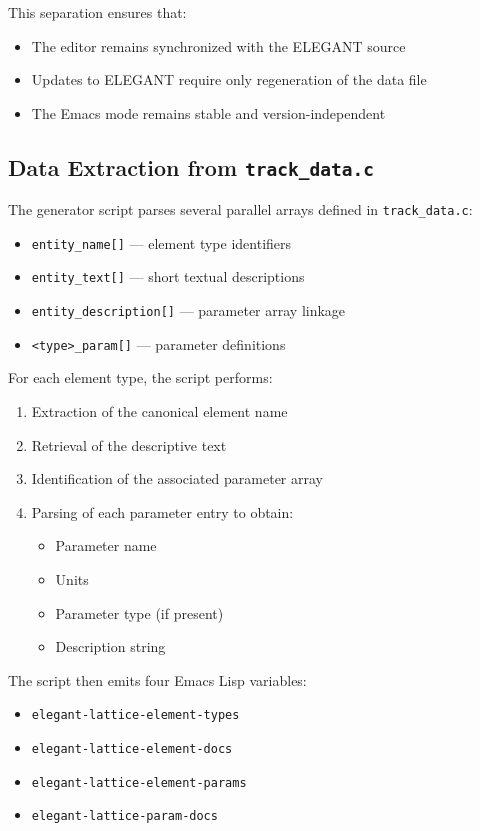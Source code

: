 This separation ensures that:

\begin{itemize}
\item The editor remains synchronized with the ELEGANT source
\item Updates to ELEGANT require only regeneration of the data file
\item The Emacs mode remains stable and version-independent
\end{itemize}

\subsection{Data Extraction from \texttt{track\_data.c}}

The generator script parses several parallel arrays defined in \texttt{track\_data.c}:

\begin{itemize}
\item \texttt{entity\_name[]} — element type identifiers
\item \texttt{entity\_text[]} — short textual descriptions
\item \texttt{entity\_description[]} — parameter array linkage
\item \texttt{<type>\_param[]} — parameter definitions
\end{itemize}

For each element type, the script performs:

\begin{enumerate}
\item Extraction of the canonical element name
\item Retrieval of the descriptive text
\item Identification of the associated parameter array
\item Parsing of each parameter entry to obtain:
      \begin{itemize}
      \item Parameter name
      \item Units
      \item Parameter type (if present)
      \item Description string
      \end{itemize}
\end{enumerate}

The script then emits four Emacs Lisp variables:

\begin{itemize}
\item \texttt{elegant-lattice-element-types}
\item \texttt{elegant-lattice-element-docs}
\item \texttt{elegant-lattice-element-params}
\item \texttt{elegant-lattice-param-docs}
\end{itemize}

